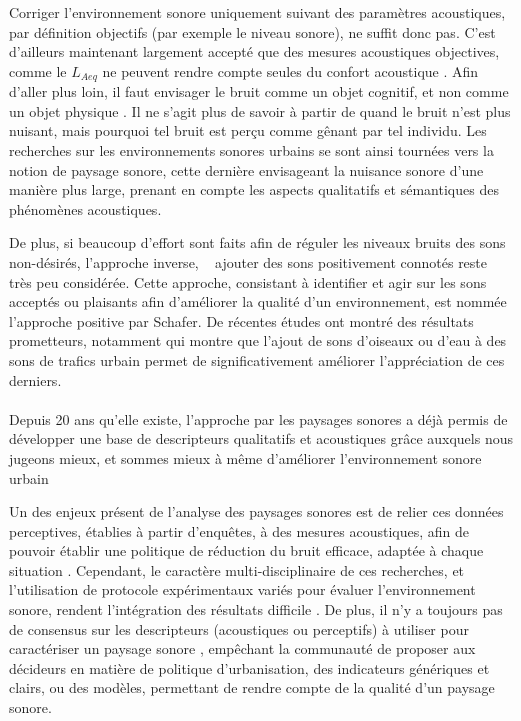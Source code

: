 Corriger l'environnement sonore uniquement suivant des paramètres acoustiques, par définition objectifs (par exemple le niveau sonore), ne suffit donc pas. C'est d'ailleurs maintenant largement accepté que des mesures acoustiques objectives, comme le $L_{Aeq}$ ne peuvent rendre compte seules du confort acoustique \citep{yang2005acoustic,schulte2006soundscape,kang2010semantic,aletta2016soundscape}. Afin d'aller plus loin, il faut envisager le bruit comme un objet cognitif, et non comme un objet physique \citep{guastavino_etude_2003}. Il ne s'agit plus de savoir à partir de quand le bruit n'est plus nuisant, mais pourquoi tel bruit est perçu comme gênant par tel individu. Les recherches sur les environnements sonores urbains se sont ainsi tournées vers la notion de paysage sonore, cette dernière envisageant la nuisance sonore d'une manière plus large, prenant en compte les aspects qualitatifs et sémantiques des phénomènes acoustiques. 

De plus, si beaucoup d’effort sont faits afin de réguler les niveaux bruits des sons non-désirés,  l'approche inverse, \ie~ ajouter des sons positivement connotés reste très peu considérée. Cette approche, consistant à identifier et agir sur les sons acceptés ou plaisants afin d'améliorer la qualité d'un environnement, est nommée l'approche positive par Schafer. De récentes études ont montré des résultats prometteurs, notamment \citep{hong2013designing} qui montre que l'ajout de sons d'oiseaux ou d'eau à des sons de trafics urbain permet de significativement améliorer l'appréciation de ces derniers. \\

\\

Depuis 20 ans qu'elle existe, l'approche par les paysages sonores a déjà permis de développer une base de descripteurs qualitatifs et acoustiques grâce auxquels nous jugeons mieux, et sommes mieux à même d'améliorer l'environnement sonore urbain  \citep{kang2006urban,schulte2007soundscape}

Un des enjeux présent de l'analyse des paysages sonores est de relier ces données perceptives, établies à partir d'enquêtes, à des mesures acoustiques, afin de pouvoir établir une politique de réduction du bruit efficace, adaptée à chaque situation \citep{schulte2013soundscape}.
Cependant, le caractère multi-disciplinaire de ces recherches, et l'utilisation de protocole expérimentaux variés pour évaluer l'environnement sonore, rendent l’intégration des résultats difficile \citep{davies2013perception}. De plus, il n'y a toujours pas de consensus sur les descripteurs (acoustiques ou perceptifs) à utiliser pour caractériser un paysage sonore \citep{brocolini2012prediction,aletta2016soundscape}, empêchant la communauté de proposer aux décideurs en matière de politique d'urbanisation, des indicateurs génériques et clairs, ou des modèles, permettant de rendre compte de la qualité d'un paysage sonore.

